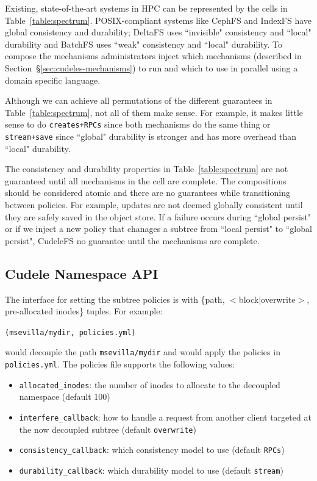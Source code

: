 Existing, state-of-the-art systems in HPC can be represented by the cells in
Table~\ref{table:spectrum}.  POSIX-compliant systems like CephFS and IndexFS
have global consistency and durability; DeltaFS uses ``invisible" consistency
and ``local" durability and BatchFS uses ``weak" consistency and ``local"
durability.  To compose the mechanisms administrators inject which mechanisms
(described in Section~\S\ref{sec:cudeles-mechanisms}) to run and which to use
in parallel using a domain specific language. 

Although we can achieve all permutations of the different guarantees in
Table~\ref{table:spectrum}, not all of them make sense. For example, it
makes little sense to do \texttt{creates+RPCs} since both mechanisms do the same
thing or \texttt{stream+save} since ``global" durability is stronger and has
more overhead than ``local" durability. 

The consistency and durability properties in Table~\ref{table:spectrum} are not
guaranteed until all mechanisms in the cell are complete. The compositions
should be considered atomic and there are no guarantees while transitioning
between policies. For example, updates are not deemed globally consistent until
they are safely saved in the object store. If a failure occurs during ``global
persist" or if we inject a new policy that chanages a subtree from ``local
persist" to ``global persist", CudeleFS no guarantee until the mechanisms are
complete.

\subsection{Cudele Namespace API}
\label{sec:cudele-namespace-api}

The interface for setting the subtree policies is with \{path,
\(<\)block\(|\)overwrite\(>\), pre-allocated inodes\} tuples. For example:

\texttt{(msevilla/mydir, policies.yml)}

would decouple the path \texttt{msevilla/mydir} and would apply the policies in
\texttt{policies.yml}. The policies file supports the following values:

\begin{itemize}

  \item \texttt{allocated\_inodes}: the number of inodes to allocate to the
  decoupled namespace (default 100)

  \item \texttt{interfere\_callback}: how to handle a request from another
  client targeted at the now decoupled subtree (default \texttt{overwrite})

  \item \texttt{consistency\_callback}: which consistency model to use (default
  \texttt{RPCs})

  \item \texttt{durability\_callback}: which durability model to use (default
  \texttt{stream})

\end{itemize}


